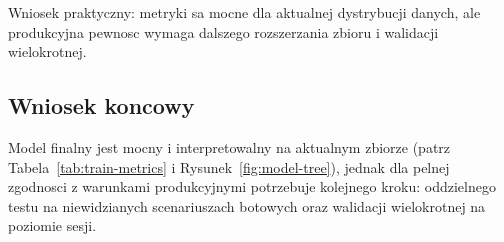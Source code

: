 Wniosek praktyczny: metryki sa mocne dla aktualnej dystrybucji danych,
ale produkcyjna pewnosc wymaga dalszego rozszerzania zbioru i walidacji wielokrotnej.

\subsection{Wniosek koncowy}
Model finalny jest mocny i interpretowalny na aktualnym zbiorze (patrz
Tabela~\ref{tab:train-metrics} i Rysunek~\ref{fig:model-tree}),
jednak dla pelnej zgodnosci z warunkami produkcyjnymi potrzebuje kolejnego kroku:
oddzielnego testu na niewidzianych scenariuszach botowych oraz walidacji wielokrotnej
na poziomie sesji.

